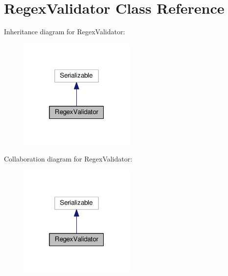 \hypertarget{classRegexValidator}{}\section{Regex\+Validator Class Reference}
\label{classRegexValidator}


Inheritance diagram for Regex\+Validator\+:\nopagebreak
\begin{figure}[H]
\begin{center}
\leavevmode
\includegraphics[width=163pt]{classRegexValidator__inherit__graph}
\end{center}
\end{figure}


Collaboration diagram for Regex\+Validator\+:\nopagebreak
\begin{figure}[H]
\begin{center}
\leavevmode
\includegraphics[width=163pt]{classRegexValidator__coll__graph}
\end{center}
\end{figure}
